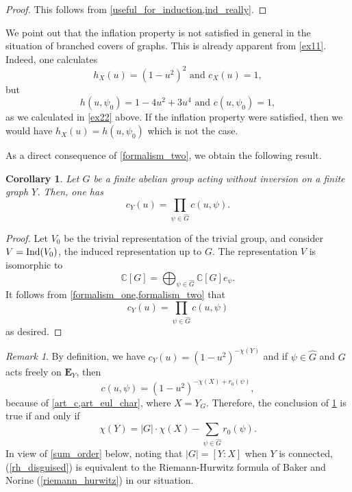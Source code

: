 \documentclass[11pt]{amsart}
\newtheorem{corollary}[theorem]{Corollary}
\numberwithin{equation}{section}
\theoremstyle{remark}
\newtheorem{remark}[theorem]{Remark}
\theoremstyle{definition}
\begin{document}
\begin{proof}
This follows from \cref{useful_for_induction,ind_really}.
\end{proof}


We point out that the inflation property is not satisfied in general in the situation of branched covers of graphs.  This is already apparent from \cref{ex11}.  Indeed, one calculates
$$h_{X}(u) =  (1-u^{2})^{2} \text{ and } c_{X}(u) = 1,$$
but
$$h(u,\psi_{0}) = 1-4u^{2} + 3u^{4} \text{ and } c(u,\psi_{0}) = 1, $$
as we calculated in \cref{ex22} above.  If the inflation property were satisfied, then we would have $h_{X}(u) = h(u,\psi_{0})$ which is not the case.

As a direct consequence of \cref{formalism_two}, we obtain the following result.
\begin{corollary} \label{product_form_for_c}
Let $G$ be a finite abelian group acting without inversion on a finite graph $Y$.  Then, one has
$$c_{Y}(u) = \prod_{\psi \in \widehat{G}}c(u,\psi). $$
\end{corollary}
\begin{proof}
Let $V_{0}$ be the trivial representation of the trivial group, and consider $V = {\rm Ind}(V_{0})$, the induced representation up to $G$.  The representation $V$ is isomorphic to 
$$\mathbb{C}[G] = \bigoplus_{\psi \in \widehat{G}} \mathbb{C}[G] e_{\psi}. $$
It follows from \cref{formalism_one,formalism_two} that
$$c_{Y}(u) = \prod_{\psi \in \widehat{G}} c(u,\psi)$$
as desired.
\end{proof}

\begin{remark}
By definition, we have $c_{Y}(u) = (1-u^{2})^{-\chi(Y)}$ and if $\psi \in \widehat{G}$ and $G$ acts freely on $\mathbf{E}_{Y}$, then 
$$c(u,\psi) = (1-u^{2})^{-\chi(X) + r_{0}(\psi)},$$ 
because of \cref{art_c,art_eul_char}, where $X = Y_{G}$.  Therefore, the conclusion of \cref{product_form_for_c} is true if and only if
\begin{equation} \label{rh_disguised}
\chi(Y) = |G| \cdot \chi(X) - \sum_{\psi \in \widehat{G}}r_{0}(\psi). 
\end{equation}
In view of \cref{sum_order} below, noting that $|G| = [Y:X]$ when $Y$ is connected, (\ref{rh_disguised}) is equivalent to the Riemann-Hurwitz formula of Baker and Norine (\cref{riemann_hurwitz}) in our situation.
\end{remark}
\end{document}
